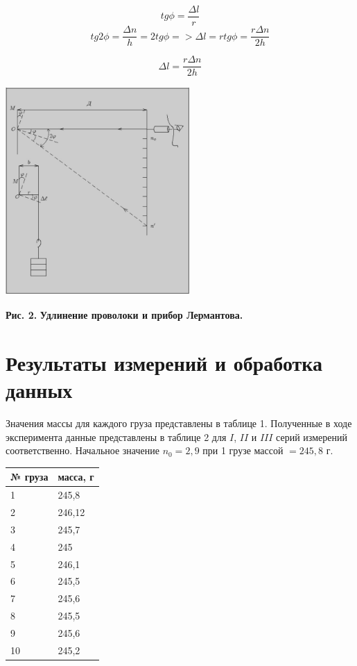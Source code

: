 \[tg\phi = \frac{\Delta l}{r}\]
\[tg2\phi = \frac{\Delta n}{h} = 2 tg\phi => \Delta l = r tg\phi = \frac{r \Delta n}{2h}\]
    
\begin{equation} \label{dl}
    \Delta l = \frac{r \Delta n}{2h}
\end{equation}


\begin{center}
\includegraphics[width=7cm, height=8cm]{deltal.jpeg}
\end{center}
\begin{flushright}
{\scriptsize \textbf{Рис. 2.} \textbf {Удлинение проволоки и прибор Лермантова.}}
\end{flushright}


\section{Результаты измерений и обработка данных}

    Значения массы для каждого груза представлены в таблице 1. Полученные в ходе эксперимента данные представлены в таблице 2 для $I$, $II$ и $III$ серий измерений соответственно. Начальное значение $n_0 = 2,9$ при 1 грузе массой $= 245,8$ г.
    
    
\begin{table}[H]
\centering
\begin{tabular}{|l|l|}
\hline
№ груза & масса, г \\ \hline
1       & 245,8    \\ \hline
2       & 246,12   \\ \hline
3       & 245,7    \\ \hline
4       & 245      \\ \hline
5       & 246,1    \\ \hline
6       & 245,5    \\ \hline
7       & 245,6    \\ \hline
8       & 245,5    \\ \hline
9       & 245,6    \\ \hline
10      & 245,2    \\ \hline
\end{tabular}
\end{table}
 
